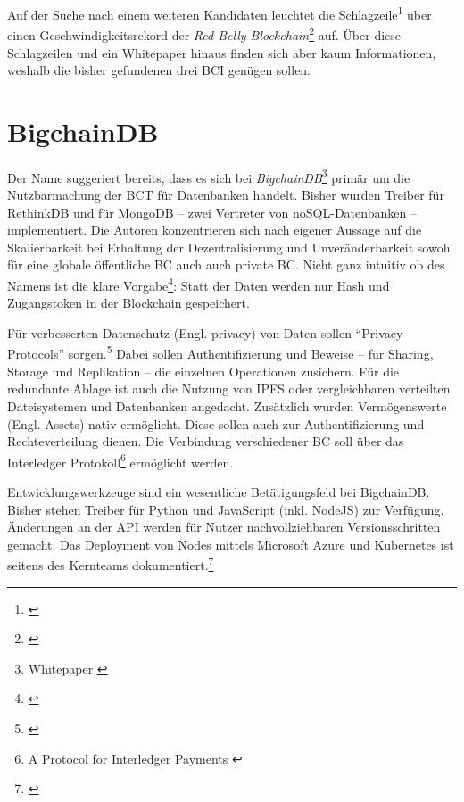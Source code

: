 Auf der Suche nach einem weiteren Kandidaten leuchtet die Schlagzeile\footnote{\autocite{w:rebealley:sydney}} über einen Geschwindigkeitsrekord der \emph{Red Belly Blockchain}\footnote{\autocite{p:rbbc}} auf.
Über diese Schlagzeilen und ein Whitepaper hinaus finden sich aber kaum Informationen, weshalb die bisher gefundenen drei \gls{BCI} genügen sollen.

\section{BigchainDB}

Der Name suggeriert bereits, dass es sich bei \emph{BigchainDB}\footnote{Whitepaper \autocite{p:bigchaindb}} primär um die Nutzbarmachung der \gls{BCT} für Datenbanken handelt.
Bisher wurden Treiber für RethinkDB und für MongoDB -- zwei Vertreter von noSQL-Datenbanken -- implementiert. Die Autoren konzentrieren sich nach eigener Aussage auf die Skalierbarkeit bei Erhaltung der Dezentralisierung und Unveränderbarkeit sowohl für eine globale öffentliche \gls{BC} auch auch private \gls{BC}.
Nicht ganz intuitiv ob des Namens ist die klare Vorgabe\footnote{\autocite{w:bcdb:features}}: Statt der Daten werden nur Hash und Zugangstoken in der Blockchain gespeichert.

Für verbesserten Datenschutz (Engl. privacy) von Daten sollen \enquote{Privacy Protocols} sorgen.\footnote{\cite{w:github-bigchaindb-pp}}
Dabei sollen Authentifizierung und Beweise -- für \ua{} Sharing, Storage und Replikation -- die einzelnen Operationen zusichern.
Für die redundante Ablage ist auch die Nutzung von \gls{IPFS} oder vergleichbaren verteilten Dateisystemen und Datenbanken angedacht.
Zusätzlich wurden Vermögenswerte (Engl. Assets) nativ ermöglicht.
Diese sollen auch zur Authentifizierung und Rechteverteilung dienen.
Die Verbindung verschiedener \gls{BC} soll \zB{} über das Interledger Protokoll\footnote{A Protocol for Interledger Payments \autocite{p:interledger}}\label{first:interledger} ermöglicht werden.

Entwicklungswerkzeuge sind ein wesentliche Betätigungsfeld bei BigchainDB.
Bisher stehen Treiber für Python und JavaScript (inkl. NodeJS) zur Verfügung.
Änderungen an der API werden für Nutzer nachvollziehbaren Versionsschritten gemacht.
Das Deployment von Nodes mittels Microsoft Azure und Kubernetes ist seitens des Kernteams dokumentiert.\footnote{\cite{w:bigchaindb-proddepl}}

